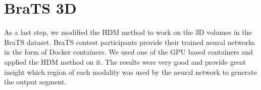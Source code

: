 \section{BraTS 3D}
As a last step, we modified the HDM method to work on the 3D volumes in the BraTS dataset. BraTS contest participants provide their trained neural networks in the form of Docker containers. We used one of the GPU based containers and applied the HDM method on it. The results were very good and provide great insight which region of each modality was used by the neural network to generate the output segment.
